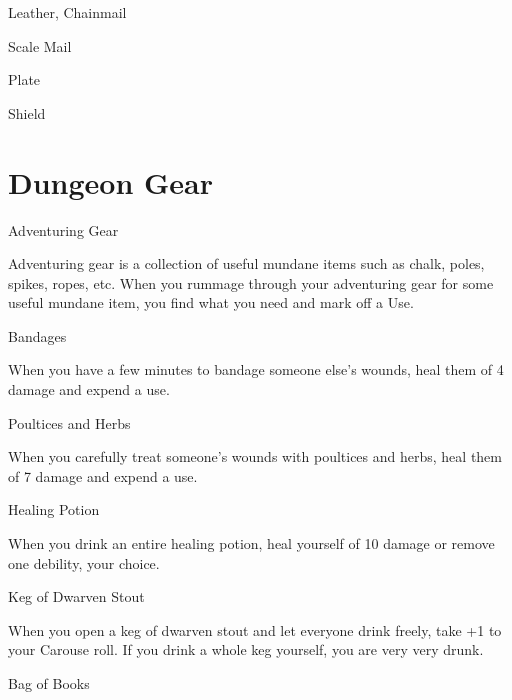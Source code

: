 Leather, Chainmail	 

 

Scale Mail	 

 

Plate	 

 

Shield	 

 
\section{Dungeon Gear}    
 

Adventuring Gear	 

 

Adventuring gear is a collection of useful mundane items such as chalk, poles, spikes, ropes, etc. When you rummage through your adventuring gear for some useful mundane item, you find what you need and mark off a Use.

 

Bandages	 

 

When you have a few minutes to bandage someone else's wounds, heal them of 4 damage and expend a use.

 

Poultices and Herbs	 

 

When you carefully treat someone's wounds with poultices and herbs, heal them of 7 damage and expend a use.

 

Healing Potion	 

 

When you drink an entire healing potion, heal yourself of 10 damage or remove one debility, your choice.

 

Keg of Dwarven Stout	 

 

When you open a keg of dwarven stout and let everyone drink freely, take +1 to your Carouse roll. If you drink a whole keg yourself, you are very very drunk.

 

Bag of Books	 

